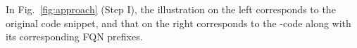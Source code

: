 In Fig.~\ref{fig:approach} (Step I), the illustration on the left corresponds to the original code snippet, and that on the right corresponds to the \blank-code along with its corresponding FQN prefixes.


